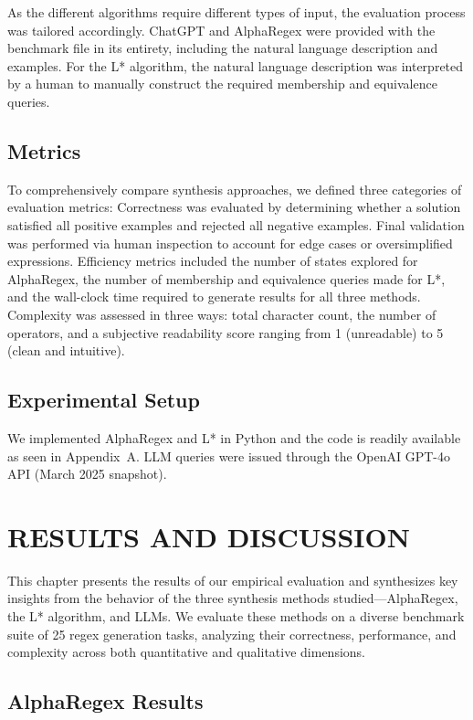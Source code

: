 \indent\indent As the different algorithms require different types of input, the evaluation process was tailored accordingly. ChatGPT and AlphaRegex were provided with the benchmark file in its entirety, including the natural language description and examples. For the L* algorithm, the natural language description was interpreted by a human to manually construct the required membership and equivalence queries.

\section{Metrics}

\indent\indent To comprehensively compare synthesis approaches, we defined three categories of evaluation metrics:
Correctness was evaluated by determining whether a solution satisfied all positive examples and rejected all negative examples. Final validation was performed via human inspection to account for edge cases or oversimplified expressions. Efficiency metrics included the number of states explored for AlphaRegex, the number of membership and equivalence queries made for L*, and the wall-clock time required to generate results for all three methods. Complexity was assessed in three ways: total character count, the number of operators, and a subjective readability score ranging from 1 (unreadable) to 5 (clean and intuitive).

\section{Experimental Setup}

\indent\indent We implemented AlphaRegex and L* in Python and the code is readily available as seen in Appendix~A. LLM queries were issued through the OpenAI GPT-4o API (March 2025 snapshot).

\chapter{RESULTS AND DISCUSSION}

\indent\indent This chapter presents the results of our empirical evaluation and synthesizes key insights from the behavior of the three synthesis methods studied—AlphaRegex, the L* algorithm, and LLMs. We evaluate these methods on a diverse benchmark suite of 25 regex generation tasks, analyzing their correctness, performance, and complexity across both quantitative and qualitative dimensions.

\section{AlphaRegex Results}

